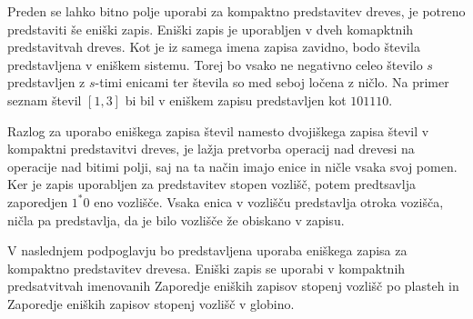 Preden se lahko bitno polje uporabi za kompaktno predstavitev dreves, je potreno predstaviti še eniški zapis. Eniški zapis je uporabljen v dveh komapktnih predstavitvah dreves. Kot je iz samega imena zapisa zavidno, bodo števila predstavljena v eniškem sistemu. Torej bo vsako ne negativno celeo število $s$ predstavljen z $s$-timi enicami ter števila so med seboj ločena z ničlo. Na primer seznam števil $[1,3]$ bi bil v eniškem zapisu predstavljen kot $101110$.

Razlog za uporabo eniškega zapisa števil namesto dvojiškega zapisa števil v kompaktni predstavitvi dreves, je lažja pretvorba operacij nad drevesi na operacije nad bitimi polji, saj na ta način imajo enice in ničle vsaka svoj pomen. Ker je zapis uporabljen za predstavitev stopen vozlišč, potem predtsavlja zaporedjen $1^*0$ eno vozlišče. Vsaka enica v vozlišču predstavlja otroka vozišča, ničla pa predstavlja, da je bilo vozlišče že obiskano v zapisu.

V naslednjem podpoglavju bo predstavljena uporaba eniškega zapisa za kompaktno predstavitev drevesa. Eniški zapis se uporabi v kompaktnih predsatvitvah imenovanih Zaporedje eniških zapisov stopenj vozlišč po plasteh in Zaporedje eniških zapisov stopenj vozlišč v globino.
